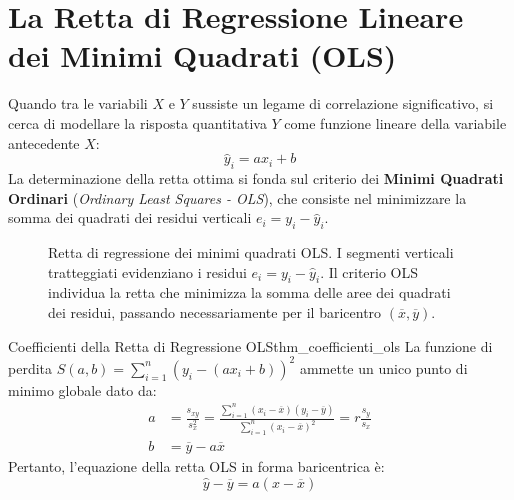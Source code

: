 \section{La Retta di Regressione Lineare dei Minimi Quadrati (OLS)}
\label{sec:regressione_lineare_descrittiva}

Quando tra le variabili $X$ e $Y$ sussiste un legame di correlazione significativo, si cerca di modellare la risposta quantitativa $Y$ come funzione lineare della variabile antecedente $X$:
\begin{equation}
\widehat{y}_i = a x_i + b
\end{equation}
La determinazione della retta ottima si fonda sul criterio dei \textbf{Minimi Quadrati Ordinari} (\emph{Ordinary Least Squares - OLS}), che consiste nel minimizzare la somma dei quadrati dei residui verticali $e_i = y_i - \widehat{y}_i$.

\begin{figure}[htbp]
\centering

\caption{Retta di regressione dei minimi quadrati OLS. I segmenti verticali tratteggiati evidenziano i residui $e_i = y_i - \widehat{y}_i$. Il criterio OLS individua la retta che minimizza la somma delle aree dei quadrati dei residui, passando necessariamente per il baricentro $(\overline{x}, \overline{y})$.}
\label{fig:regressione_ols_residui}
\end{figure}

\begin{teorema}{Coefficienti della Retta di Regressione OLS}{thm_coefficienti_ols}
La funzione di perdita $S(a, b) = \sum_{i=1}^n (y_i - (a x_i + b))^2$ ammette un unico punto di minimo globale dato da:
\begin{align}
a &= \frac{s_{xy}}{s_x^2} = \frac{\sum_{i=1}^n (x_i - \overline{x})(y_i - \overline{y})}{\sum_{i=1}^n (x_i - \overline{x})^2} = r \frac{s_y}{s_x} \\
b &= \overline{y} - a\overline{x}
\end{align}
Pertanto, l'equazione della retta OLS in forma baricentrica è:
\begin{equation}
\widehat{y} - \overline{y} = a (x - \overline{x})
\end{equation}
\end{teorema}

